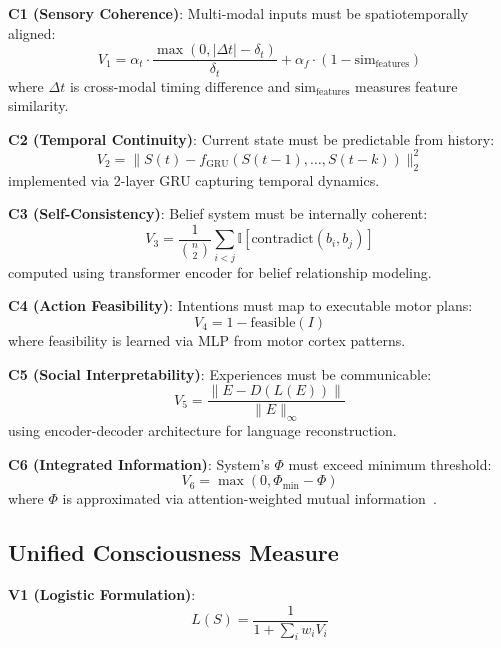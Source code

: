 \documentclass[10pt,journal,compsoc]{IEEEtran}
\begin{document}
\textbf{C1 (Sensory Coherence)}: Multi-modal inputs must be spatiotemporally aligned:
\begin{equation}
V_1 = \alpha_t \cdot \frac{\max(0, |\Delta t| - \delta_t)}{\delta_t} + \alpha_f \cdot (1 - \text{sim}_{\text{features}})
\end{equation}
where $\Delta t$ is cross-modal timing difference and $\text{sim}_{\text{features}}$ measures feature similarity.

\textbf{C2 (Temporal Continuity)}: Current state must be predictable from history:
\begin{equation}
V_2 = \|S(t) - f_{\text{GRU}}(S(t-1), \ldots, S(t-k))\|_2^2
\end{equation}
implemented via 2-layer GRU capturing temporal dynamics.

\textbf{C3 (Self-Consistency)}: Belief system must be internally coherent:
\begin{equation}
V_3 = \frac{1}{\binom{n}{2}} \sum_{i<j} \mathbb{I}[\text{contradict}(b_i, b_j)]
\end{equation}
computed using transformer encoder for belief relationship modeling.

\textbf{C4 (Action Feasibility)}: Intentions must map to executable motor plans:
\begin{equation}
V_4 = 1 - \text{feasible}(I)
\end{equation}
where feasibility is learned via MLP from motor cortex patterns.

\textbf{C5 (Social Interpretability)}: Experiences must be communicable:
\begin{equation}
V_5 = \frac{\|E - D(L(E))\|}{\|E\|_\infty}
\end{equation}
using encoder-decoder architecture for language reconstruction.

\textbf{C6 (Integrated Information)}: System's $\Phi$ must exceed minimum threshold:
\begin{equation}
V_6 = \max(0, \Phi_{\min} - \Phi)
\end{equation}
where $\Phi$ is approximated via attention-weighted mutual information~\cite{barrett2011}.

\subsection{Unified Consciousness Measure}

\textbf{V1 (Logistic Formulation)}:
\begin{equation}
L(S) = \frac{1}{1 + \sum_i w_i V_i}
\end{equation}
\end{document}
